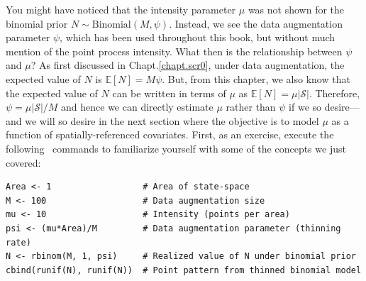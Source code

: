 You might have noticed that the intensity parameter $\mu$ was not shown for the
binomial prior $N \sim \text{Binomial}(M, \psi)$. Instead, we see the
data augmentation parameter $\psi$, which has been used throughout
this book, but without much mention of the point process
intensity. What then is the relationship between $\psi$ and $\mu$?
As first discussed in Chapt.\ref{chapt.scr0}, under data augmentation,
the expected value of $N$ is $\mathbb{E}[N] = M\psi$. But, from this
chapter, we also know that the
expected value of $N$ can be written in terms of $\mu$ as
$\mathbb{E}[N] = \mu|\mathcal{S}|$. Therefore,
$\psi = \mu|\mathcal{S}| / M$ and hence we can directly estimate $\mu$
rather than $\psi$ if we so desire---and we will so desire in the next
section where the objective is to model $\mu$ as a function of
spatially-referenced covariates. First, as an exercise, execute the
following \R~commands to familiarize yourself with some of the
concepts we just covered:
\begin{small}
\begin{verbatim}
Area <- 1                  # Area of state-space
M <- 100                   # Data augmentation size
mu <- 10                   # Intensity (points per area)
psi <- (mu*Area)/M         # Data augmentation parameter (thinning rate)
N <- rbinom(M, 1, psi)     # Realized value of N under binomial prior
cbind(runif(N), runif(N))  # Point pattern from thinned binomial model
\end{verbatim}
\end{small}

